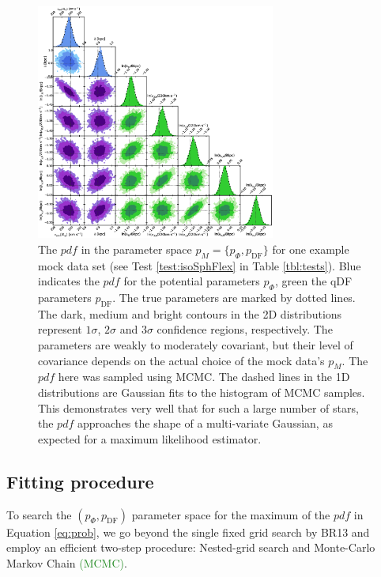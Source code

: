 \documentclass[iop,revtex4]{emulateapj}
\newcommand{\pdf}{\ensuremath{pdf}}
\newcommand{\pmodel}{\ensuremath{p_M}}
\newcommand{\NEW}[1]{\textcolor{ForestGreen}{#1}}
\begin{document}
\begin{figure}[!htbp]
\centering
\includegraphics[width=0.7\textwidth]{figs/isoSphFlex_short_hot_2kpc_triangle_MCMC.eps}
\caption{The \pdf{} in the parameter space $\pmodel{} = \{p_\Phi,p_\text{DF}\}$ for one example mock data set (see Test \ref{test:isoSphFlex} in Table \ref{tbl:tests}). Blue indicates the \pdf{} for the potential parameters $p_\Phi$, green the qDF parameters $p_\text{DF}$. The true parameters are marked by dotted lines. The dark, medium and bright contours in the 2D distributions represent $1\sigma$, $2\sigma$ and $3\sigma$ confidence regions, respectively. The parameters are weakly to moderately covariant, but their level of covariance depends on the actual choice of the mock data's \pmodel{}. The \pdf{} here was sampled using MCMC. The dashed lines in the 1D distributions are Gaussian fits to the histogram of MCMC samples. This demonstrates very well that for such a large number of stars, the \pdf{} approaches the shape of a multi-variate Gaussian, as expected for a maximum likelihood estimator.}
\label{fig:isoSphFlex_triangleplot}
\end{figure}

\subsection{Fitting procedure} \label{sec:fitting}

To search the $(p_\Phi,p_\text{DF})$ parameter space for the maximum of the \pdf{} in Equation \eqref{eq:prob}, we go beyond the single fixed grid search by BR13 and employ an efficient two-step procedure: Nested-grid search and Monte-Carlo Markov Chain \NEW{(MCMC)}.
\end{document}
